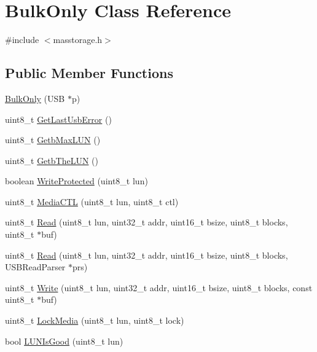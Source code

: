 \hypertarget{class_bulk_only}{\section{\-Bulk\-Only \-Class \-Reference}
\label{class_bulk_only}
}


{\ttfamily \#include $<$masstorage.\-h$>$}

\subsection*{\-Public \-Member \-Functions}
\begin{DoxyCompactItemize}
\item 
\hyperlink{class_bulk_only_a530fb250b0a0c92b48bc57e2957ace25}{\-Bulk\-Only} (\-U\-S\-B $\ast$p)
\item 
uint8\-\_\-t \hyperlink{class_bulk_only_abe1e768a46e751e6792164334c973b44}{\-Get\-Last\-Usb\-Error} ()
\item 
uint8\-\_\-t \hyperlink{class_bulk_only_af4779aa3a30058dd15eb6e612d6761af}{\-Getb\-Max\-L\-U\-N} ()
\item 
uint8\-\_\-t \hyperlink{class_bulk_only_adfec4b466c0ba9db172d057727b07ab1}{\-Getb\-The\-L\-U\-N} ()
\item 
boolean \hyperlink{class_bulk_only_ab0976e6d4f5fdeff800f3769e7b287c9}{\-Write\-Protected} (uint8\-\_\-t lun)
\item 
uint8\-\_\-t \hyperlink{class_bulk_only_a2fc74b11c2ecce30e89f84cc1efe0c81}{\-Media\-C\-T\-L} (uint8\-\_\-t lun, uint8\-\_\-t ctl)
\item 
uint8\-\_\-t \hyperlink{class_bulk_only_a470a8f0ffd6694d9dfc834da5efa627a}{\-Read} (uint8\-\_\-t lun, uint32\-\_\-t addr, uint16\-\_\-t bsize, uint8\-\_\-t blocks, uint8\-\_\-t $\ast$buf)
\item 
uint8\-\_\-t \hyperlink{class_bulk_only_a52f54376dcd7f5baf17718105e8f085d}{\-Read} (uint8\-\_\-t lun, uint32\-\_\-t addr, uint16\-\_\-t bsize, uint8\-\_\-t blocks, \-U\-S\-B\-Read\-Parser $\ast$prs)
\item 
uint8\-\_\-t \hyperlink{class_bulk_only_a45d327ddf87e01607c3a5b1849936053}{\-Write} (uint8\-\_\-t lun, uint32\-\_\-t addr, uint16\-\_\-t bsize, uint8\-\_\-t blocks, const uint8\-\_\-t $\ast$buf)
\item 
uint8\-\_\-t \hyperlink{class_bulk_only_ae7561d686d0b1374b5f9937d6ec8a035}{\-Lock\-Media} (uint8\-\_\-t lun, uint8\-\_\-t lock)
\item 
bool \hyperlink{class_bulk_only_aa6d74267dc98daeb0552fa234739ab08}{\-L\-U\-N\-Is\-Good} (uint8\-\_\-t lun)

\end{DoxyCompactItemize}

